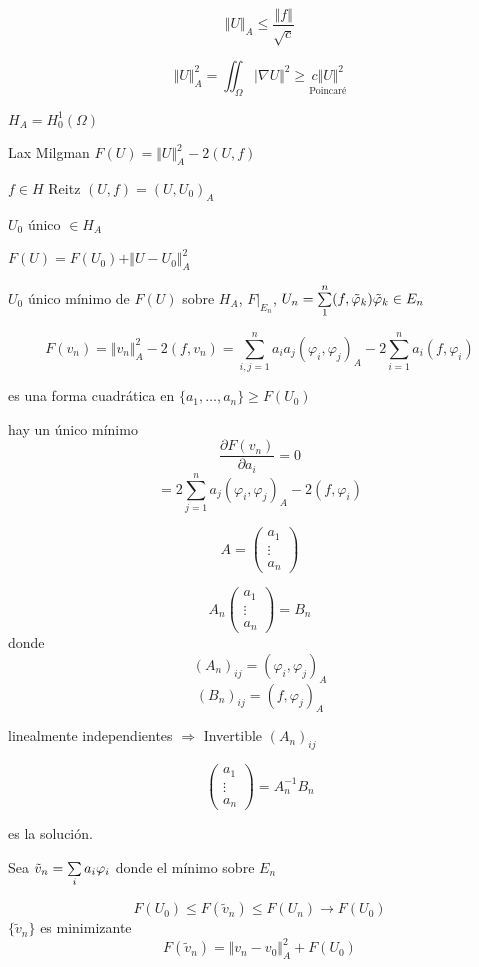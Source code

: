 \documentclass[a4paper,10pt]{book}
\begin{document}
 \[
 \Vert U\Vert_A\leq \frac{\Vert f\Vert}{ \sqrt{c}}
 \]

 \[
 \Vert U\Vert_A^2 = \iint_\Omega | \nabla U\Vert^2 \geq \underset{ \text{Poincaré} }{c\Vert U\Vert^2}
 \]

$H_A=H_0^1(\Omega)$

Lax Milgman $F(U)= \Vert U\Vert_A^2 -2 (U,f)$

$f\in H$ Reitz  $(U,f) = (U,U_0)_A$ 

$U_0$ único $\in H_A$

$F(U) = F(U_0) + \Vert U-U_0\Vert_ A^2$

$U_0$ único mínimo de $F(U)$ sobre $H_A$, $F|_{E_n}$,  $U_n= \sum\limits_1^n (f,\Tilde{\varphi}_k)  \Tilde{\varphi}_k \in E_n$

\[F(v_n) = \Vert v_n \Vert_A^2 -2 (f, v_n) = \sum\limits_{i,j=1}^n a_i a_j (\varphi_i,\varphi_j)_A- 2\sum\limits_{i=1}^n a_i (f,\varphi_i)
\]

es una forma cuadrática en $\{ a_1,\ldots,a_n\} \geq F(U_0) $

hay un único mínimo 
\[\frac{\partial F (v_n)}{ \partial a_i} = 0\]
\[
= 2 \sum\limits_{j=1}^{n} a_j (\varphi_i,\varphi_j)_A -2 (f,\varphi_i )
\]

\[
A=\left(
\begin{array}{c}
a_1\\
\vdots \\
a_n
\end{array}\right)
\]

\[
A_n \left(
\begin{array}{c}
a_1\\
\vdots \\
a_n
\end{array}\right) = B_n
\]
donde
\[ (A_n)_{ij}=  (\varphi_i,\varphi_j)_A\]
\[ (B_n)_{ij}=  (f,\varphi_j)_A\]

linealmente independientes $\Rightarrow$ Invertible $(A_n)_{ij}$


\[
\left(
\begin{array}{c}
a_1\\
\vdots \\
a_n
\end{array}\right) = A_n^{-1} B_n 
\]

es la solución.

Sea $\Tilde{v}_n =\sum\limits_{i} a_i \varphi_i  $ donde el mínimo sobre $E_n$

\[
F(U_0) \leq F( \tilde{v}_n ) \leq F(U_n) \rightarrow F(U_0)
\]
$\{ \tilde{v}_n\}$ es minimizante
\[
F(\tilde{v}_n) =  \Vert v_n -v_0 \Vert_A^2 + F(U_0)
\]
\end{document}
